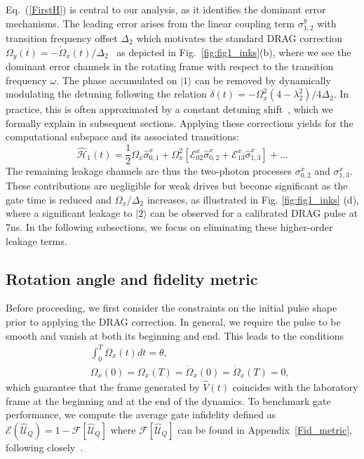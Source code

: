 \documentclass[superscriptaddress,amsmath,amssymb,aps,twocolumn,praplied,notitlepage]{revtex4-2}
\newcommand{\ket}[1]{\vert #1 \rangle}
\begin{document}
Eq.~(\ref{FirstH}) is central to our analysis, as it identifies the dominant error mechanisms. The leading error arises from the linear coupling term \(\sigma_{1,2}^y\) with transition frequency offset $\Delta_{2}$ which motivates the standard DRAG correction $\Omega_{y}(t)=-\dot{\Omega}_{x}(t)/\Delta_{2}$~\cite{motzoi2009simple} as depicted in Fig.~\ref{fig:fig1_inks}(b), where we see the dominant error channels in the rotating frame with respect to the transition frequency $\omega$. The phase accumulated on $\ket{1}$ can be removed by dynamically modulating the detuning following the relation $\delta(t) =-\Omega_x^2(4-\lambda_{2}^2)/4\Delta_2$.
In practice, this is often approximated by a constant detuning shift~\cite{PhysRevA.83.012308,PhysRevLett.116.020501}, which we formally explain in subsequent sections.
Applying these corrections yields { for the computational subspace and its associated transitions}:
\begin{equation}
 \hat{\mathcal{H}}_{1}(t) =\frac{1}{2} \Omega_{x} \hat{\sigma}_{0,1}^x+ \Omega_x^2[\mathcal{E}^x_{02}\hat{\sigma}_{0,2}^x +  \mathcal{E}^x_{13}\hat{\sigma}_{1,3}^x]+\dots\nonumber 
\end{equation}
The remaining leakage channels are thus the two-photon processes \(\sigma_{0,2}^x\) and \(\sigma_{1,3}^x\). These contributions are negligible for weak drives but become significant as the gate time is reduced and $\Omega_x/\Delta_2$ increases, as illustrated in Fig. \ref{fig:fig1_inks} (d), where a significant leakage to $|2\rangle$  can be observed for a {calibrated DRAG pulse at 7ns}. In the following subsections, we focus on eliminating these higher-order leakage terms.


\subsection{Rotation angle and fidelity metric}\label{sec:trialfn}

Before proceeding, we first consider the constraints on the initial pulse shape prior to applying the DRAG correction.
In general, we require the pulse to be smooth and vanish at both its beginning and end. This leads to the conditions
\begin{subequations}
\begin{eqnarray}
\label{Exp1}
&&\int_0^T \Omega_x(t)dt = \theta, \\
\label{Exp2}
&&\Omega_x(0) =\Omega_x(T)=\dot{\Omega}_x(0) =\dot{\Omega}_x(T) =0,
\end{eqnarray}
\end{subequations}
which guarantee that the frame generated by $\hat{V}(t)$ coincides with the laboratory frame at the beginning and at the end of the dynamics.
To benchmark gate performance, we compute the average gate infidelity defined as $\mathcal{E}(\hat{\mathcal{U}}_Q)=1-\mathcal{F} [\hat{\mathcal{U}}_Q]$ where $\mathcal{F} [\hat{\mathcal{U}}_Q]$ can be found in Appendix~\ref{Fid_metric}, following closely~\cite{Pedersen2007Fidelity}.
\end{document}
